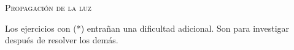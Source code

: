 \documentclass[11pt, spanish, a4paper, twoside]{article}
\begin{document}
\begin{center}
	\textsc{\LARGE Propagación de la luz}
\end{center}

Los ejercicios con (*) entrañan una dificultad adicional. Son para investigar después de resolver los demás.


\begin{enumerate}







\end{enumerate}
\end{document}
